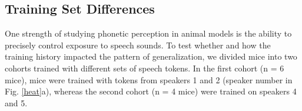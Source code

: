 \subsection{Training Set Differences}

%
%
%
%
One strength of studying phonetic perception in animal models is the ability to precisely control exposure to speech sounds. To test whether and how the training history impacted the pattern of generalization, we divided mice into two cohorts trained with different sets of speech tokens. In the first cohort (n = 6 mice), mice were trained with tokens from speakers 1 and 2 (speaker number in Fig. \ref{heat}a), whereas the second cohort (n = 4 mice) were trained on speakers 4 and 5.


